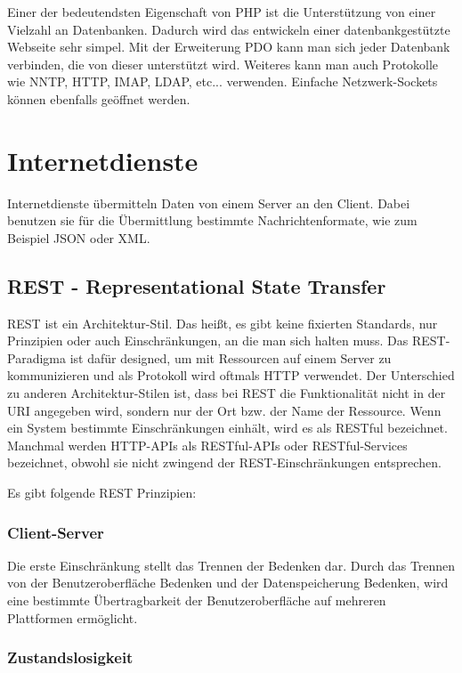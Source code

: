 Einer der bedeutendsten Eigenschaft von PHP ist die Unterstützung von einer Vielzahl an Datenbanken. Dadurch wird das entwickeln einer datenbankgestützte Webseite sehr simpel. Mit der Erweiterung PDO kann man sich jeder Datenbank verbinden, die von dieser unterstützt wird. Weiteres kann man auch Protokolle wie NNTP, HTTP, IMAP, LDAP, etc... verwenden. Einfache Netzwerk-Sockets können ebenfalls geöffnet werden.

\section{Internetdienste}

Internetdienste\cite{WebServices} übermitteln Daten von einem Server an den Client. Dabei benutzen sie für die Übermittlung bestimmte Nachrichtenformate, wie zum Beispiel JSON oder XML. 

\subsection{REST - Representational State Transfer}

REST\cite{REST} ist ein Architektur-Stil\cite{RESTArchitektur}. Das heißt, es gibt keine fixierten Standards, nur Prinzipien\cite{RESTPrinzipien} oder auch Einschränkungen, an die man sich halten muss. Das REST-Paradigma\cite{RESTConcept} ist dafür designed, um mit Ressourcen auf einem Server zu kommunizieren und als Protokoll wird oftmals HTTP verwendet. Der Unterschied zu anderen Architektur-Stilen ist, dass bei REST die Funktionalität nicht in der URI angegeben wird, sondern nur der Ort bzw. der Name der Ressource. Wenn ein System bestimmte Einschränkungen einhält, wird es als RESTful bezeichnet. Manchmal werden HTTP-APIs als RESTful-APIs oder RESTful-Services bezeichnet, obwohl sie nicht zwingend der REST-Einschränkungen entsprechen.

Es gibt folgende REST Prinzipien:

\subsubsection{Client-Server} 

Die erste Einschränkung stellt das Trennen der Bedenken dar. Durch das Trennen von der Benutzeroberfläche Bedenken und der Datenspeicherung Bedenken, wird eine bestimmte Übertragbarkeit der Benutzeroberfläche auf mehreren Plattformen ermöglicht.

\subsubsection{Zustandslosigkeit}

